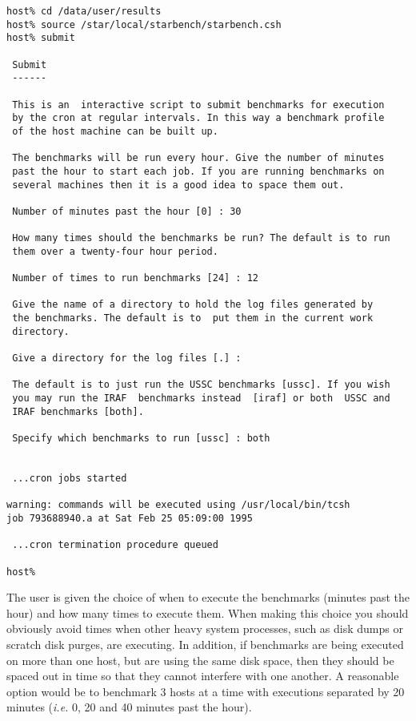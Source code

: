 \begin{enumerate}
\begin{verbatim}
host% cd /data/user/results
host% source /star/local/starbench/starbench.csh
host% submit

 Submit
 ------

 This is an  interactive script to submit benchmarks for execution
 by the cron at regular intervals. In this way a benchmark profile
 of the host machine can be built up.

 The benchmarks will be run every hour. Give the number of minutes
 past the hour to start each job. If you are running benchmarks on
 several machines then it is a good idea to space them out.

 Number of minutes past the hour [0] : 30

 How many times should the benchmarks be run? The default is to run
 them over a twenty-four hour period.

 Number of times to run benchmarks [24] : 12

 Give the name of a directory to hold the log files generated by
 the benchmarks. The default is to  put them in the current work
 directory.

 Give a directory for the log files [.] :

 The default is to just run the USSC benchmarks [ussc]. If you wish
 you may run the IRAF  benchmarks instead  [iraf] or both  USSC and
 IRAF benchmarks [both].

 Specify which benchmarks to run [ussc] : both


 ...cron jobs started

warning: commands will be executed using /usr/local/bin/tcsh
job 793688940.a at Sat Feb 25 05:09:00 1995

 ...cron termination procedure queued

host%
\end{verbatim}

The user is given the choice of when to execute the benchmarks (minutes
past the hour) and how many times to execute them. When making this
choice you should obviously avoid times when other heavy system
processes, such as disk dumps or scratch disk purges, are executing. In
addition, if benchmarks are being executed on more than one host, but
are using the same disk space, then they should be spaced out in time
so that they cannot interfere with one another. A reasonable option
would be to benchmark 3 hosts at a time with executions separated by 20
minutes ({\em i.e.} 0, 20 and 40 minutes past the hour).


\end{enumerate}
